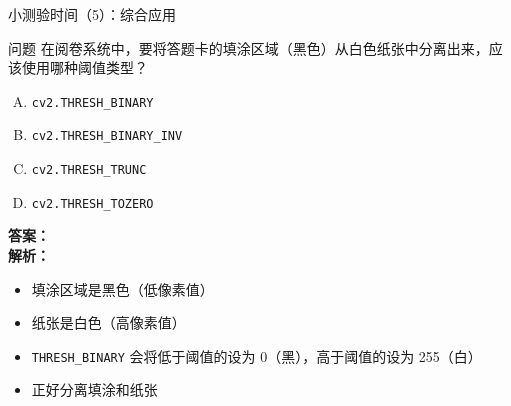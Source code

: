 \begin{frame}[fragile]{小测验时间（5）：综合应用}
	\begin{block}{问题}
		在阅卷系统中，要将答题卡的填涂区域（黑色）从白色纸张中分离出来，应该使用哪种阈值类型？
		\begin{enumerate}[(A)]
			\item \texttt{cv2.THRESH\_BINARY}
			\item \texttt{cv2.THRESH\_BINARY\_INV}
			\item \texttt{cv2.THRESH\_TRUNC}
			\item \texttt{cv2.THRESH\_TOZERO}
		\end{enumerate}
	\end{block}
	\pause
	\textbf{答案：}  \\
	\vspace{0.2cm}
	\textbf{解析：}
	\begin{itemize}
		\item 填涂区域是黑色（低像素值）
		\item 纸张是白色（高像素值）
		\item \texttt{THRESH\_BINARY} 会将低于阈值的设为 0（黑），高于阈值的设为 255（白）
		\item 正好分离填涂和纸张
	\end{itemize}
\end{frame}
